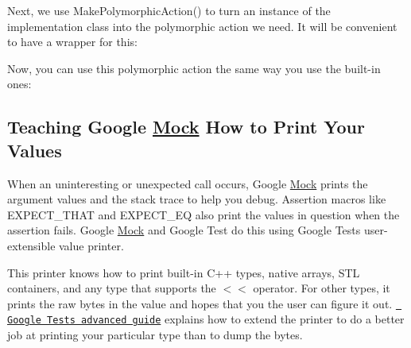 Next, we use {\ttfamily Make\+Polymorphic\+Action()} to turn an instance of the implementation class into the polymorphic action we need. It will be convenient to have a wrapper for this\+:


\begin{DoxyCode}{0}
\DoxyCodeLine{}
\DoxyCodeLine{\}}
\end{DoxyCode}


Now, you can use this polymorphic action the same way you use the built-\/in ones\+:


\begin{DoxyCode}{0}
\DoxyCodeLine{}
\DoxyCodeLine{\};}
\DoxyCodeLine{}
\end{DoxyCode}


\subsection*{Teaching Google \mbox{\hyperlink{class_mock}{Mock}} How to Print Your Values}

When an uninteresting or unexpected call occurs, Google \mbox{\hyperlink{class_mock}{Mock}} prints the argument values and the stack trace to help you debug. Assertion macros like {\ttfamily E\+X\+P\+E\+C\+T\+\_\+\+T\+H\+AT} and {\ttfamily E\+X\+P\+E\+C\+T\+\_\+\+EQ} also print the values in question when the assertion fails. Google \mbox{\hyperlink{class_mock}{Mock}} and Google Test do this using Google Test\textquotesingle{}s user-\/extensible value printer.

This printer knows how to print built-\/in C++ types, native arrays, S\+TL containers, and any type that supports the {\ttfamily $<$$<$} operator. For other types, it prints the raw bytes in the value and hopes that you the user can figure it out. \href{http://code.google.com/p/googletest/wiki/V1_6_AdvancedGuide#Teaching_Google_Test_How_to_Print_Your_Values}\texttt{ Google Test\textquotesingle{}s advanced guide} explains how to extend the printer to do a better job at printing your particular type than to dump the bytes. 